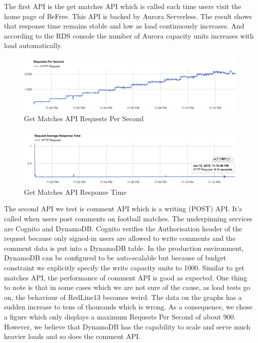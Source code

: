 \documentclass[conference]{IEEEtran}
\begin{document}
The first API is the get matches API which is called each time users visit the home page of BeFree. This API is backed by Aurora Serverless. The result shows that response time remains stable and low as load continuously increases. And according to the RDS console the number of Aurora capacity units increases with load automatically.

\begin{figure}[htbp]
 \centerline{\includegraphics[scale=0.26]{matches-qps.png}}
\caption{Get Matches API Requests Per Second}
\end{figure}

\begin{figure}[htbp]
\centerline{\includegraphics[scale=0.26]{matches-response-time.png}}
\caption{Get Matches API Response Time}
\end{figure}

The second API we test is comment API which is a writing (POST) API. It's called when users post comments on football matches. The underpinning services are Cognito and DynamoDB. Cognito verifies the Authorisation header of the request because only signed-in users are allowed to write comments and the comment data is put into a DynamoDB table. In the production environment, DynamoDB can be configured to be auto-scalable but because of budget constraint we explicitly specify the write capacity units to 1000. Similar to get matches API, the performance of comment API is good as expected. One thing to note is that in some cases which we are not sure of the cause, as load tests go on, the behaviour of RedLine13 becomes weird. The data on the graphs has a sudden increase to tens of thousands which is wrong. As a consequence, we chose a figure which only displays a maximum Requests Per Second of about 900. However, we believe that DynamoDB has the capability to scale and serve much heavier loads and so does the comment API.
\end{document}
